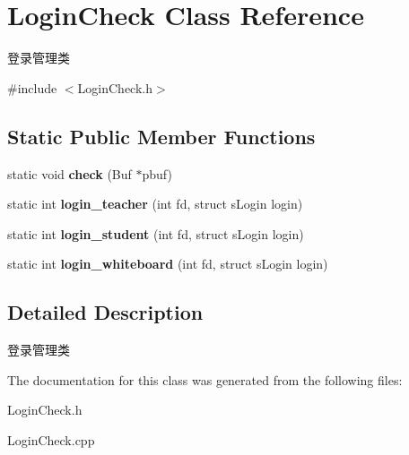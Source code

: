 \hypertarget{classLoginCheck}{\section{\-Login\-Check \-Class \-Reference}
\label{classLoginCheck}
}


登录管理类  




{\ttfamily \#include $<$\-Login\-Check.\-h$>$}

\subsection*{\-Static \-Public \-Member \-Functions}
\begin{DoxyCompactItemize}
\item 
\hypertarget{classLoginCheck_a765350632bf2f478c52f1cd784d5d695}{static void {\bfseries check} (\-Buf $\ast$pbuf)}\label{classLoginCheck_a765350632bf2f478c52f1cd784d5d695}

\item 
\hypertarget{classLoginCheck_a3a00a71b46f143a7bba5df851c2b3e9e}{static int {\bfseries login\-\_\-teacher} (int fd, struct s\-Login login)}\label{classLoginCheck_a3a00a71b46f143a7bba5df851c2b3e9e}

\item 
\hypertarget{classLoginCheck_a9dd3eacd449338a78c2217510b58f833}{static int {\bfseries login\-\_\-student} (int fd, struct s\-Login login)}\label{classLoginCheck_a9dd3eacd449338a78c2217510b58f833}

\item 
\hypertarget{classLoginCheck_ac84b4625f7449cc05e21e3bd13b3ef1c}{static int {\bfseries login\-\_\-whiteboard} (int fd, struct s\-Login login)}\label{classLoginCheck_ac84b4625f7449cc05e21e3bd13b3ef1c}

\end{DoxyCompactItemize}


\subsection{\-Detailed \-Description}
登录管理类 

\-The documentation for this class was generated from the following files\-:\begin{DoxyCompactItemize}
\item 
\-Login\-Check.\-h\item 
\-Login\-Check.\-cpp\end{DoxyCompactItemize}
